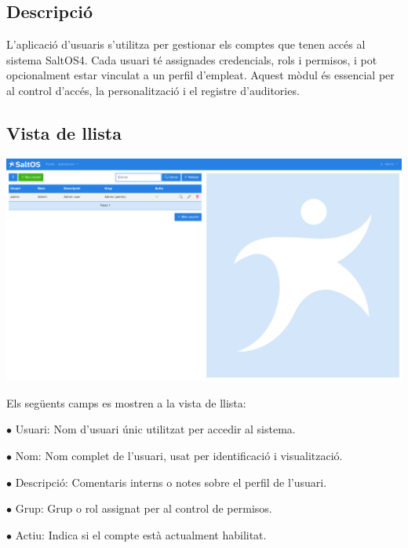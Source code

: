 \documentclass[a4paper]{article}
\begin{document}
\hypertarget{toc182}{}
\subsection{Descripció}

L'aplicació d'usuaris s'utilitza per gestionar els comptes que tenen accés al sistema SaltOS4.
Cada usuari té assignades credencials, rols i permisos, i pot opcionalment estar vinculat a un perfil d'empleat.
Aquest mòdul és essencial per al control d'accés, la personalització i el registre d'auditories.

\hypertarget{toc183}{}
\subsection{Vista de llista}

\begin{center}\includegraphics[width=1\textwidth]{../ujest/snaps/test-screenshots-js-screenshots-users-users-list-ca-es-1-snap.png}\end{center}

Els següents camps es mostren a la vista de llista:

\begin{compactitem}
\item[\color{myblue}$\bullet$] Usuari: Nom d'usuari únic utilitzat per accedir al sistema.
\item[\color{myblue}$\bullet$] Nom: Nom complet de l'usuari, usat per identificació i visualització.
\item[\color{myblue}$\bullet$] Descripció: Comentaris interns o notes sobre el perfil de l'usuari.
\item[\color{myblue}$\bullet$] Grup: Grup o rol assignat per al control de permisos.
\item[\color{myblue}$\bullet$] Actiu: Indica si el compte està actualment habilitat.
\end{compactitem}
\end{document}
